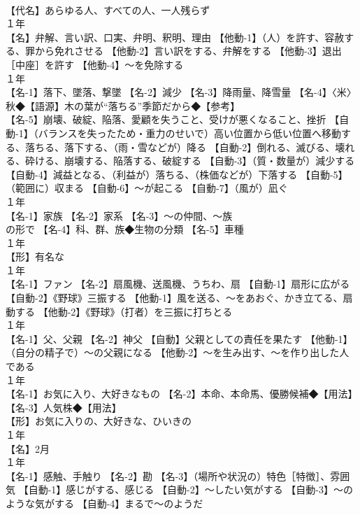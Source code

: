 \documentclass[8pt]{extreport}
\begin{document}
\begin{CJK}{UTF8}{min}
\\	【代名】あらゆる人、すべての人、一人残らず
\\	１年	
\\	【名】弁解、言い訳、口実、弁明、釈明、理由 【他動-1】（人）を許す、容赦する、罪から免れさせる 【他動-2】言い訳をする、弁解をする 【他動-3】退出［中座］を許す 【他動-4】～を免除する
\\	１年	
\\	【名-1】落下、墜落、撃墜 【名-2】減少 【名-3】降雨量、降雪量 【名-4】〈米〉秋◆【語源】木の葉が“落ちる”季節だから◆【参考】
\\	【名-5】崩壊、破綻、陥落、愛顧を失うこと、受けが悪くなること、挫折 【自動-1】（バランスを失ったため・重力のせいで）高い位置から低い位置へ移動する、落ちる、落下する、（雨・雪などが）降る 【自動-2】倒れる、滅びる、壊れる、砕ける、崩壊する、陥落する、破綻する 【自動-3】（質・数量が）減少する 【自動-4】減益となる、（利益が）落ちる、（株価などが）下落する 【自動-5】（範囲に）収まる 【自動-6】～が起こる 【自動-7】（風が）凪ぐ
\\	１年	
\\	【名-1】家族 【名-2】家系 【名-3】～の仲間、～族
\\	の形で 【名-4】科、群、族◆生物の分類 【名-5】車種
\\	１年	
\\	【形】有名な
\\	１年	
\\	【名-1】ファン 【名-2】扇風機、送風機、うちわ、扇 【自動-1】扇形に広がる 【自動-2】《野球》三振する 【他動-1】風を送る、～をあおぐ、かき立てる、扇動する 【他動-2】《野球》（打者）を三振に打ちとる
\\	１年	
\\	【名-1】父、父親 【名-2】神父 【自動】父親としての責任を果たす 【他動-1】（自分の精子で）～の父親になる 【他動-2】～を生み出す、～を作り出した人である
\\	１年	
\\	【名-1】お気に入り、大好きなもの 【名-2】本命、本命馬、優勝候補◆【用法】
\\	【名-3】人気株◆【用法】
\\	【形】お気に入りの、大好きな、ひいきの
\\	１年	
\\	【名】2月
\\	１年	
\\	【名-1】感触、手触り 【名-2】勘 【名-3】（場所や状況の）特色［特徴］、雰囲気 【自動-1】感じがする、感じる 【自動-2】～したい気がする 【自動-3】～のような気がする 【自動-4】まるで～のようだ

\end{CJK}
\end{document}
